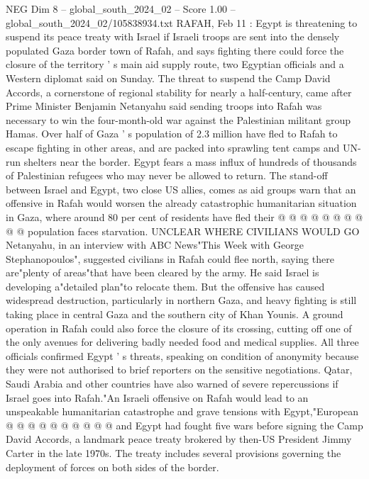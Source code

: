 \begin{textsample}{NEG Dim 8 – global\_south\_2024\_02 – Score 1.00 – global\_south\_2024\_02/105838934.txt}  \label{ex:f8_neg_254}
RAFAH, Feb 11 : Egypt is threatening to suspend its peace treaty with Israel if Israeli troops are sent into the densely populated Gaza border town of Rafah, and says fighting there could force the closure of the territory ' s main aid supply route, two Egyptian officials and a Western diplomat said on Sunday.
The threat to suspend the Camp David Accords, a cornerstone of regional stability for nearly a half-century, came after Prime Minister Benjamin Netanyahu said sending troops into Rafah was necessary to win the four-month-old war against the Palestinian militant group Hamas.
Over half of Gaza ' s population of 2.3 million have fled to Rafah to escape fighting in other areas, and are packed into sprawling tent camps and UN-run shelters near the border.
Egypt fears a mass influx of hundreds of thousands of Palestinian refugees who may never be allowed to return.
The stand-off between Israel and Egypt, two close US allies, comes as aid groups warn that an offensive in Rafah would worsen the already catastrophic humanitarian situation in Gaza, where around 80 per cent of residents have fled their @ @ @ @ @ @ @ @ @ @ population faces starvation.
UNCLEAR WHERE CIVILIANS WOULD GO Netanyahu, in an interview with ABC News"This Week with George Stephanopoulos", suggested civilians in Rafah could flee north, saying there are"plenty of areas"that have been cleared by the army.
He said Israel is developing a"detailed plan"to relocate them.
But the offensive has caused widespread destruction, particularly in northern Gaza, and heavy fighting is still taking place in central Gaza and the southern city of Khan Younis.
A ground operation in Rafah could also force the closure of its crossing, cutting off one of the only avenues for delivering badly needed food and medical supplies.
All three officials confirmed Egypt ' s threats, speaking on condition of anonymity because they were not authorised to brief reporters on the sensitive negotiations.
Qatar, Saudi Arabia and other countries have also warned of severe repercussions if Israel goes into Rafah."An Israeli offensive on Rafah would lead to an unspeakable humanitarian catastrophe and grave tensions with Egypt,"European @ @ @ @ @ @ @ @ @ @ and Egypt had fought five wars before signing the Camp David Accords, a landmark peace treaty brokered by then-US President Jimmy Carter in the late 1970s.
The treaty includes several provisions governing the deployment of forces on both sides of the border.

\end{textsample}
